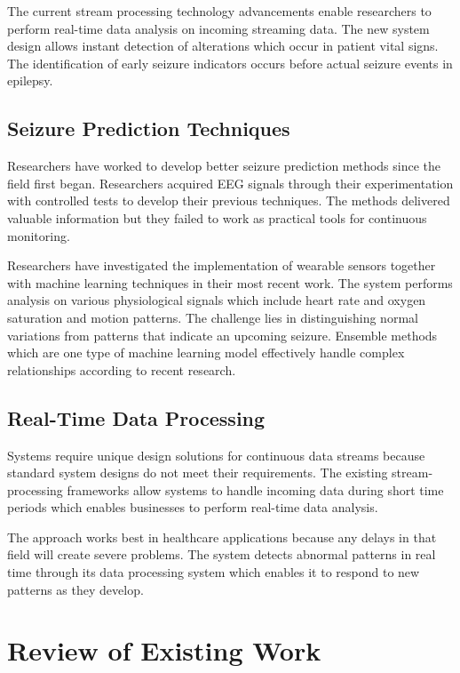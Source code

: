 \documentclass[12pt, a4paper, oneside]{report}
\begin{document}
The current stream processing technology advancements enable researchers to perform real-time data analysis on incoming streaming data. The new system design allows instant detection of alterations which occur in patient vital signs. The identification of early seizure indicators occurs before actual seizure events in epilepsy.

\subsection{Seizure Prediction Techniques}

Researchers have worked to develop better seizure prediction methods since the field first began. Researchers acquired EEG signals through their experimentation with controlled tests to develop their previous techniques. The methods delivered valuable information but they failed to work as practical tools for continuous monitoring.

Researchers have investigated the implementation of wearable sensors together with machine learning techniques in their most recent work. The system performs analysis on various physiological signals which include heart rate and oxygen saturation and motion patterns. The challenge lies in distinguishing normal variations from patterns that indicate an upcoming seizure. Ensemble methods which are one type of machine learning model effectively handle complex relationships according to recent research.

\subsection{Real-Time Data Processing}

Systems require unique design solutions for continuous data streams because standard system designs do not meet their requirements. The existing stream-processing frameworks allow systems to handle incoming data during short time periods which enables businesses to perform real-time data analysis.

The approach works best in healthcare applications because any delays in that field will create severe problems. The system detects abnormal patterns in real time through its data processing system which enables it to respond to new patterns as they develop.

\section{Review of Existing Work}
\end{document}
